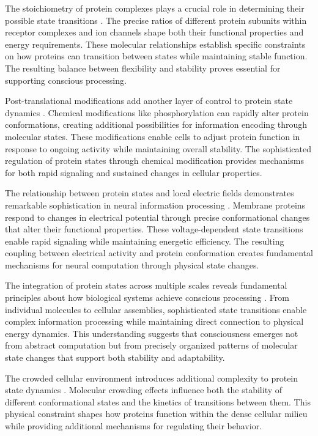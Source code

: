 The stoichiometry of protein complexes plays a crucial role in determining their possible state transitions \cite{Brangwynne2015}. The precise ratios of different protein subunits within receptor complexes and ion channels shape both their functional properties and energy requirements. These molecular relationships establish specific constraints on how proteins can transition between states while maintaining stable function. The resulting balance between flexibility and stability proves essential for supporting conscious processing.

Post-translational modifications add another layer of control to protein state dynamics \cite{Wright2015}. Chemical modifications like phosphorylation can rapidly alter protein conformations, creating additional possibilities for information encoding through molecular states. These modifications enable cells to adjust protein function in response to ongoing activity while maintaining overall stability. The sophisticated regulation of protein states through chemical modification provides mechanisms for both rapid signaling and sustained changes in cellular properties.

The relationship between protein states and local electric fields demonstrates remarkable sophistication in neural information processing \cite{Tokuriki2009}. Membrane proteins respond to changes in electrical potential through precise conformational changes that alter their functional properties. These voltage-dependent state transitions enable rapid signaling while maintaining energetic efficiency. The resulting coupling between electrical activity and protein conformation creates fundamental mechanisms for neural computation through physical state changes.

The integration of protein states across multiple scales reveals fundamental principles about how biological systems achieve conscious processing \cite{Thirumalai2017}. From individual molecules to cellular assemblies, sophisticated state transitions enable complex information processing while maintaining direct connection to physical energy dynamics. This understanding suggests that consciousness emerges not from abstract computation but from precisely organized patterns of molecular state changes that support both stability and adaptability.

The crowded cellular environment introduces additional complexity to protein state dynamics \cite{Roh2017}. Molecular crowding effects influence both the stability of different conformational states and the kinetics of transitions between them. This physical constraint shapes how proteins function within the dense cellular milieu while providing additional mechanisms for regulating their behavior.

